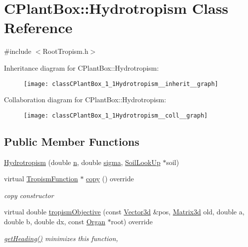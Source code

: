 \hypertarget{classCPlantBox_1_1Hydrotropism}{}\section{C\+Plant\+Box\+:\+:Hydrotropism Class Reference}
\label{classCPlantBox_1_1Hydrotropism}


{\ttfamily \#include $<$Root\+Tropism.\+h$>$}



Inheritance diagram for C\+Plant\+Box\+:\+:Hydrotropism\+:\nopagebreak
\begin{figure}[H]
\begin{center}
\leavevmode
\texttt{[image: classCPlantBox\_1\_1Hydrotropism\_\_inherit\_\_graph]}
\end{center}
\end{figure}


Collaboration diagram for C\+Plant\+Box\+:\+:Hydrotropism\+:\nopagebreak
\begin{figure}[H]
\begin{center}
\leavevmode
\texttt{[image: classCPlantBox\_1\_1Hydrotropism\_\_coll\_\_graph]}
\end{center}
\end{figure}
\subsection*{Public Member Functions}
\begin{DoxyCompactItemize}
\item 
\hyperlink{classCPlantBox_1_1Hydrotropism_a7ffb4286e84c0d1b06374b43ceb29848}{Hydrotropism} (double \hyperlink{classCPlantBox_1_1TropismFunction_a619c74d63319c406730c95679784a04a}{n}, double \hyperlink{classCPlantBox_1_1TropismFunction_acdc5f9c3beda0a74ddadd591c5d8afaf}{sigma}, \hyperlink{classCPlantBox_1_1SoilLookUp}{Soil\+Look\+Up} $\ast$soil)
\item 
\mbox{\label{classCPlantBox_1_1Hydrotropism_abf5359dcc5966638e89c802dd49a47bb}} 
virtual \hyperlink{classCPlantBox_1_1TropismFunction}{Tropism\+Function} $\ast$ \hyperlink{classCPlantBox_1_1Hydrotropism_abf5359dcc5966638e89c802dd49a47bb}{copy} () override
\begin{DoxyCompactList}\small\item\em copy constructor \end{DoxyCompactList}\item 
virtual double \hyperlink{classCPlantBox_1_1Hydrotropism_a5f259c82922f6d62df17f07827db0338}{tropism\+Objective} (const \hyperlink{classCPlantBox_1_1Vector3d}{Vector3d} \&pos, \hyperlink{classCPlantBox_1_1Matrix3d}{Matrix3d} old, double a, double b, double dx, const \hyperlink{classCPlantBox_1_1Organ}{Organ} $\ast$root) override
\begin{DoxyCompactList}\small\item\em \hyperlink{classCPlantBox_1_1TropismFunction_adb52b88734a94fe1365a00e02c7e6be5}{get\+Heading()} minimizes this function, \end{DoxyCompactList}\end{DoxyCompactItemize}
